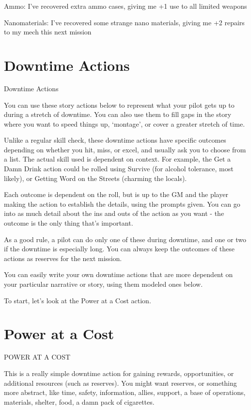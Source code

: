 	        Ammo: I’ve recovered extra ammo cases, giving me +1 use to all limited weapons

	        Nanomaterials: I’ve recovered some strange nano materials, giving me +2 repairs to my
mech this next mission



\section{Downtime Actions}

                                           Downtime Actions


You can use these story actions below to represent what your pilot gets up to during a stretch of
downtime. You can also use them to fill gaps in the story where you want to speed things up,
‘montage’, or cover a greater stretch of time.


Unlike a regular skill check, these downtime actions have specific outcomes depending on
whether you hit, miss, or excel, and usually ask you to choose from a list. The actual skill used is
dependent on context. For example, the Get a Damn Drink action could be rolled using Survive
(for alcohol tolerance, most likely), or Getting Word on the Streets (charming the locals).


Each outcome is dependent on the roll, but is up to the GM and the player making the action to
establish the details, using the prompts given. You can go into as much detail about the ins and
outs of the action as you want - the outcome is the only thing that’s important.

As a good rule, a pilot can do only one of these during downtime, and one or two if the downtime
is especially long. You can always keep the outcomes of these actions as reserves for the next
mission.

You can easily write your own downtime actions that are more dependent on your particular
narrative or story, using them modeled ones below.

To start, let’s look at the Power at a Cost action.

\section{Power at a Cost}
POWER AT A COST

This is a really simple downtime action for gaining rewards, opportunities, or additional
resources (such as reserves). You might want reserves, or something more abstract, like time,
safety, information, allies, support, a base of operations, materials, shelter, food, a damn
pack of cigarettes.


